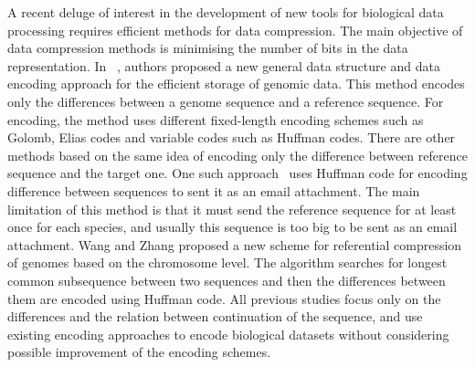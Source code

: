 \documentclass[preprint,12pt]{elsarticle}
\begin{document}
A recent deluge of interest in the development of new tools for biological data processing requires efficient methods for data compression. The main objective of data compression methods is minimising the number of bits in the data representation. 
In ~\cite{bra09}, authors proposed a new general data structure and data encoding approach for the efficient storage of genomic data. This method encodes only the differences between a genome sequence and a reference sequence. For encoding, the method uses different fixed-length encoding schemes such as Golomb\cite{Golomb96}, Elias codes\cite{Elias75} and variable codes such as Huffman codes. There are other methods based on the same idea of encoding only the difference between reference sequence and the target one. One such approach~\cite{chr09} uses Huffman code for encoding difference between sequences to sent it as an email attachment. The main limitation of this method is that it must send the reference sequence for at least once for each species, and usually this sequence is too big to be sent as an email attachment.
Wang and Zhang \cite{wan11} proposed a new scheme for referential compression of genomes based on the chromosome level. The algorithm searches for longest common subsequence between two sequences and then the differences between them are encoded using Huffman code.
All previous studies focus only on the differences and the relation between continuation of the sequence, and use existing encoding approaches to encode biological datasets without considering possible improvement of the encoding schemes.

\end{document}
